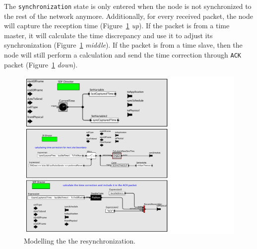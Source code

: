 The \texttt{synchronization} state is only entered when the node is not synchronized to the rest of the network anymore. Additionally, for every received packet, the node will capture the reception time (Figure~\ref{fig:timeCorrection} {\em up}). If the packet is from a time master, it will calculate the time discrepancy and use it to adjust its synchronization (Figure~\ref{fig:timeCorrection} {\em middle}). If the packet is from a time slave, then the node will still perform a calculation and send the time correction through \texttt{ACK} packet (Figure~\ref{fig:timeCorrection} {\em down}).

\begin{figure}[t]
\centering
\includegraphics[width=0.9\columnwidth]{figures/PaperReSynchronization}
\caption{Modelling the the resynchronization.}
\label{fig:timeCorrection}
\end{figure}

